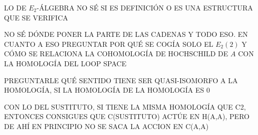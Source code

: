 \documentclass[TFM.tex]{subfiles}
\begin{document}
LO DE $E_2$-ÁLGEBRA NO SÉ SI ES DEFINICIÓN O ES UNA ESTRUCTURA QUE SE VERIFICA

NO SÉ DÓNDE PONER LA PARTE DE LAS CADENAS Y TODO ESO. EN CUANTO A ESO PREGUNTAR POR QUÉ SE COGÍA SOLO EL $E_2(2)$ Y CÓMO SE RELACIONA LA COHOMOLOGÍA DE HOCHSCHILD DE $A$ CON LA HOMOLOGÍA DEL LOOP SPACE

PREGUNTARLE QUÉ SENTIDO TIENE SER QUASI-ISOMORFO A LA HOMOLOGÍA, SI LA HOMOLOGÍA DE LA HOMOLOGÍA ES 0

CON LO DEL SUSTITUTO, SI TIENE LA MISMA HOMOLOGÍA QUE C2, ENTONCES CONSIGUES QUE C(SUSTITUTO) ACTÚE EN H(A,A), PERO DE AHÍ EN PRINCIPIO NO SE SACA LA ACCION EN C(A,A)
\end{document}
